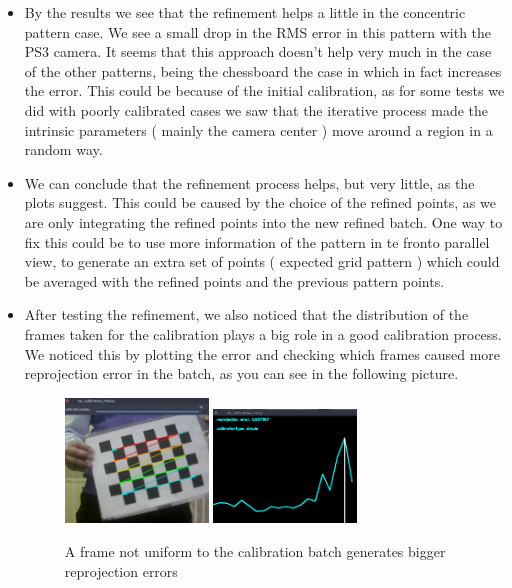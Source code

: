 \documentclass[journal]{IEEEtran}
\begin{document}
\begin{itemize}

    \item By the results we see that the refinement helps a little in the concentric pattern case. We see a small drop in the RMS error in this pattern with the PS3 camera. It seems that this approach doesn't help very much in the case of the other patterns, being the chessboard the case in which in fact increases the error. This could be because of the initial calibration, as for some tests we did with poorly calibrated cases we saw that the iterative process made the intrinsic parameters ( mainly the camera center ) move around a region in a random way.

    \item We can conclude that the refinement process helps, but very little, as the plots suggest. This could be caused by the choice of the refined points, as we are only integrating the refined points into the new refined batch. One way to fix this could be to use more information of the pattern in te fronto parallel view, to generate an extra set of points ( expected grid pattern ) which could be averaged with the refined points and the previous pattern points.

    \item After testing the refinement, we also noticed that the distribution of the frames taken for the calibration plays a big role in a good calibration process. We noticed this by plotting the error and checking which frames caused more reprojection error in the batch, as you can see in the following picture.

    \begin{figure}[H]
    \centering
    \includegraphics[width=1.5in]{_img/report_4/img_issue_frames_distribution_1.png}
    \includegraphics[width=1.5in]{_img/report_4/img_issue_frames_distribution_1_plot.png}
    \caption{A frame not uniform to the calibration batch generates bigger reprojection errors}
    \end{figure}    


\end{itemize}
\end{document}
